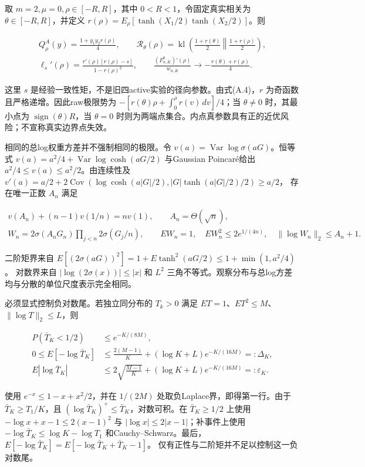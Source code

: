 \documentclass[11pt,a4paper]{article}
\begin{document}
取 \(m=2,\mu=0,\rho\in[-R,R]\)，其中 \(0<R<1\)，令固定真实相关为
\(\theta\in[-R,R]\)，并定义
\(r(\rho)=E_\rho[\tanh(X_1/2)\tanh(X_2/2)]\)。则

\[
\begin{gathered}
Q_\rho^A(y)=\frac{1+y_1y_2r(\rho)}4,\qquad
\mathcal R_\theta(\rho)=\operatorname{kl}\!\left(
\frac{1+r(\theta)}2\middle\Vert\frac{1+r(\rho)}2\right),\\
\ell_s'(\rho)=\frac{r'(\rho)[r(\rho)-s]}{1-r(\rho)^2},\qquad
\frac{(F_{n,K}^\theta)'(\rho)}{w_{n,K}}\to-\frac{r(\theta)+r(\rho)}4 .
\end{gathered}
\tag{A.24}
\]

这里 \(s\)
是经验一致性矩，不是旧四active实验的径向参数。由式(A.4)，\(r\)
为奇函数且严格递增。因此raw极限势为
\(-[r(\theta)\rho+\int_0^\rho r(v)\,dv]/4\)；当 \(\theta\ne0\)
时，其最小点为 \(\operatorname{sign}(\theta)R\)，当 \(\theta=0\)
时则为两端点集合。内点真参数具有正的近优风险；不宣称真实边界点失效。

相同的总log权重方差并不强制相同的极限。令
\(v(a)=\operatorname{Var}\log\sigma(aG)\)。恒等式
\(v(a)=a^2/4+\operatorname{Var}\log\cosh(aG/2)\) 与Gaussian Poincaré给出
\(a^2/4\le v(a)\le a^2/2\)。由连续性及
\(v'(a)=a/2+2\operatorname{Cov}(\log\cosh(a|G|/2),|G|\tanh(a|G|/2)/2)\ge a/2\)，
存在唯一正数 \(A_n\) 满足

\[
\begin{gathered}
v(A_n)+(n-1)v(1/n)=nv(1),\qquad A_n=\Theta(\sqrt n),\\
W_n=2\sigma(A_nG_n)\prod_{j<n}2\sigma(G_j/n),\qquad
EW_n=1,\quad EW_n^2\le2e^{1/(4n)},\quad
\|\log W_n\|_2\le A_n+1 .
\end{gathered}
\tag{A.25}
\]

二阶矩界来自 \(E[(2\sigma(aG))^2]=1+E\tanh^2(aG/2)\le1+\min(1,a^2/4)\)。
对数界来自 \(|\log(2\sigma(x))|\le|x|\) 和 \(L^2\)
三角不等式。观察分布与总log方差均与分散的单位尺度表示完全相同。

必须显式控制负对数尾。若独立同分布的 \(T_k>0\) 满足
\(ET=1\)、\(ET^2\le M\)、\(\|\log T\|_2\le L\)，则

\[
\begin{aligned}
P(\bar T_K<1/2)&\le e^{-K/(8M)},\\
0\le E[-\log\bar T_K]&\le
\frac{2(M-1)}K+(\log K+L)e^{-K/(16M)}=:\Delta_K,\\
E|\log\bar T_K|&\le
2\sqrt{\frac{M-1}K}+(\log K+L)e^{-K/(16M)}=:\varepsilon_K .
\end{aligned}
\tag{A.26}
\]

使用 \(e^{-x}\le1-x+x^2/2\)，并在 \(1/(2M)\)
处取负Laplace界，即得第一行。由于 \(\bar T_K\ge T_1/K\)，且
\((\log\bar T_K)^+\le\bar T_K\)，对数可积。在 \(\bar T_K\ge1/2\) 上使用
\(-\log x+x-1\le2(x-1)^2\) 与 \(|\log x|\le2|x-1|\)；补事件上使用
\(-\log\bar T_K\le\log K-\log T_1\) 和Cauchy--Schwarz。最后，
\(E[-\log\bar T_K]=E[-\log\bar T_K+\bar T_K-1]\)。
仅有正性与二阶矩并不足以控制这一负对数尾。
\end{document}
